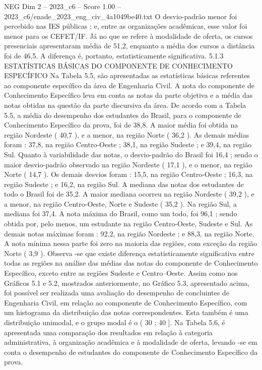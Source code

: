 \begin{textsample}{NEG Dim 2 – 2023\_c6 – Score 1.00 – 2023\_c6/enade\_2023\_eng\_civ\_4a1049be40.txt}
O desvio-padrão menor foi percebido nas IES públicas ; e, entre as organizações acadêmicas, esse valor foi menor para os CEFET/IF.
Já no que se refere à modalidade de oferta, os cursos presenciais apresentaram média de 51,2, enquanto a média dos cursos a distância foi de 46,5.
A diferença é, portanto, estatisticamente significativa. 5.1.3 ESTATÍSTICAS BÁSICAS DO COMPONENTE DE CONHECIMENTO ESPECÍFICO Na Tabela 5.5, são apresentadas as estatísticas básicas referentes ao componente específico da área de Engenharia Civil.
A nota do componente de Conhecimento Específico leva em conta as notas da parte objetiva e a média das notas obtidas na questão da parte discursiva da área.
De acordo com a Tabela 5.5, a média do desempenho dos estudantes do Brasil, para o componente de Conhecimento Específico da prova, foi de 38,8.
A maior média foi obtida na região Nordeste ( 40,7 ), e a menor, na região Norte ( 36,2 ).
As demais médias foram : 37,8, na região Centro-Oeste ; 38,1, na região Sudeste ; e 39,4, na região Sul.
Quanto à variabilidade das notas, o desvio-padrão do Brasil foi 16,4 ; sendo o maior desvio-padrão observado na região Nordeste ( 17,1 ), e o menor, na região Norte ( 14,7 ).
Os demais desvios foram : 15,5, na região Centro-Oeste ; 16,3, na região Sudeste ; e 16,2, na região Sul.
A mediana das notas dos estudantes de todo o Brasil foi de 35,2.
A maior mediana ocorreu na região Nordeste ( 39,2 ), e a menor, na região Centro-Oeste, Norte e Sudeste ( 35,2 ).
Na região Sul, a mediana foi 37,4.
A nota máxima do Brasil, como um todo, foi 96,1 ; sendo obtida por, pelo menos, um estudante na região Centro-Oeste, Sudeste e Sul.
As demais notas máximas foram : 92,2, na região Nordeste ; e 88,3, na região Norte.
A nota mínima nessa parte foi zero na maioria das regiões, com exceção da região Norte ( 3,9 ).
Observa -se que existe diferença estatisticamente significativa entre todas as regiões na análise das médias das notas do componente de Conhecimento Específico, exceto entre as regiões Sudeste e Centro--Oeste.
Assim como nos Gráficos 5.1 e 5.2, mostrados anteriormente, no Gráfico 5.3, apresentado acima, foi possível ser realizada uma avaliação do desempenho de concluintes de Engenharia Civil, em relação ao componente de Conhecimento Específico, com um histograma da distribuição das notas correspondentes.
Esta também é uma distribuição unimodal, e o grupo modal é o ( 30 ; 40 ].
Na Tabela 5.6, é apresentada uma comparação dos resultados em relação à categoria administrativa, à organização acadêmica e à modalidade de oferta, levando -se em conta o desempenho de estudantes do componente de Conhecimento Específico da prova.

\end{textsample}
